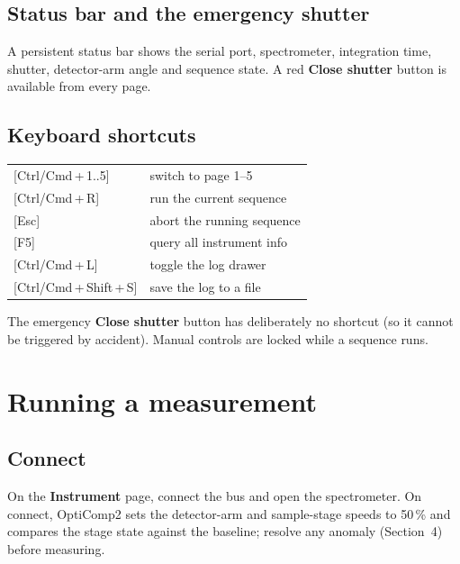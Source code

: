 \documentclass[11pt]{article}
\newcommand{\key}[1]{\textsf{\small[#1]}}
\begin{document}
\subsection{Status bar and the emergency shutter}
A persistent status bar shows the serial port, spectrometer, integration time, shutter, detector-arm
angle and sequence state. A red \textbf{Close shutter} button is available from every page.

\subsection{Keyboard shortcuts}
\begin{center}
\begin{tabular}{ll}
\toprule
\key{Ctrl/Cmd\,+\,1..5} & switch to page 1--5 \\
\key{Ctrl/Cmd\,+\,R} & run the current sequence \\
\key{Esc} & abort the running sequence \\
\key{F5} & query all instrument info \\
\key{Ctrl/Cmd\,+\,L} & toggle the log drawer \\
\key{Ctrl/Cmd\,+\,Shift\,+\,S} & save the log to a file \\
\bottomrule
\end{tabular}
\end{center}
The emergency \textbf{Close shutter} button has deliberately no shortcut (so it cannot be triggered by
accident). Manual controls are locked while a sequence runs.

\section{Running a measurement}

\subsection{Connect}
On the \textbf{Instrument} page, connect the bus and open the spectrometer. On connect, OptiComp2 sets
the detector-arm and sample-stage speeds to 50\,\% and compares the stage state against the baseline;
resolve any anomaly (Section~4) before measuring.
\end{document}
